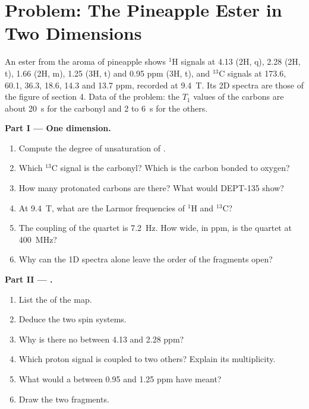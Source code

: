 \section{Problem: The Pineapple Ester in Two Dimensions}

\begin{problem}
\label{pb:b3:advanced-nmr:1}
An ester  from the aroma of pineapple shows ${}^1$H signals at 4.13 (2H,
q), 2.28 (2H, t), 1.66 (2H, m), 1.25 (3H, t) and 0.95 ppm (3H, t), and ${}^{13}$C signals
at 173.6, 60.1, 36.3, 18.6, 14.3 and 13.7 ppm, recorded at \qty{9.4}{T}. Its 2D
spectra are those of the figure of section 4. Data of the problem: the $T_1$
values of the carbons are about \qty{20}{s} for the carbonyl and 2 to \qty{6}{s} for the
others.

\medskip\noindent\textbf{Part I --- One dimension.}
\begin{enumerate}
  \item Compute the degree of unsaturation of .
  \item Which ${}^{13}$C signal is the carbonyl? Which is the carbon bonded to oxygen?
  \item How many protonated carbons are there? What would DEPT-135 show?
  \item At \qty{9.4}{T}, what are the Larmor frequencies of ${}^1$H and ${}^{13}$C?
  \item The coupling of the quartet is \qty{7.2}{Hz}. How wide, in ppm, is the
        quartet at \qty{400}{MHz}?
  \item Why can the 1D spectra alone leave the order of the fragments open?
\end{enumerate}

\medskip\noindent\textbf{Part II --- .}
\begin{enumerate}[resume]
  \item List the  of the  map.
  \item Deduce the two spin systems.
  \item Why is there no  between 4.13 and 2.28 ppm?
  \item Which proton signal is coupled to two others? Explain its multiplicity.
  \item What would a  between 0.95 and 1.25 ppm have meant?
  \item Draw the two fragments.
\end{enumerate}


\end{problem}
